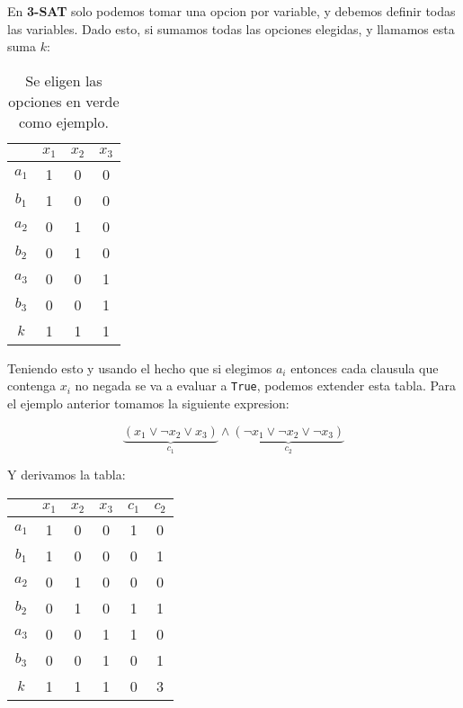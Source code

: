 \newpage 
  
En \textbf{3-SAT} solo podemos tomar una opcion por variable, y debemos definir 
todas las variables. Dado esto, si sumamos todas las opciones elegidas, y 
llamamos esta suma $k$: 

\begin{table}[h!]
  \centering
  \begin{tabular}{ c|c c c }
    & $x_1$ & $x_2$ & $x_3$ \\
    \hline 
    $a_1$ & 1 & 0 & 0 \\
    \rowcolor{green!30}
    $b_1$ & 1 & 0 & 0 \\
    \rowcolor{green!30}
    $a_2$ & 0 & 1 & 0 \\
    $b_2$ & 0 & 1 & 0 \\
    $a_3$ & 0 & 0 & 1 \\
    \rowcolor{green!30}
    $b_3$ & 0 & 0 & 1 \\
    \hline
    $k$ & 1 & 1 & 1 \\
  \end{tabular} 
  \caption*{Se eligen las opciones en verde como ejemplo.}
\end{table}

Teniendo esto y usando el hecho que si elegimos $a_i$ entonces cada clausula 
que contenga $x_i$ no negada se va a evaluar a \texttt{True}, podemos extender esta 
tabla. 
Para el ejemplo anterior tomamos la siguiente expresion: 

\[
  \underbrace{(x_1 \lor \neg x_2 \lor x_3)}_{c_1} 
  \land 
  \underbrace{(\neg x_1 \lor \neg x_2 \lor \neg x_3)}_{c_2} 
\]

Y derivamos la tabla: 

\begin{table}[h!]
  \centering
  \begin{tabular}{ c|c c c | c c }
    & $x_1$ & $x_2$ & $x_3$ & $c_1$ & $c_2$ \\
    \hline 
    $a_1$ & 1 & 0 & 0 & 1 & 0 \\
    \rowcolor{green!30}
    $b_1$ & 1 & 0 & 0 & 0 & 1 \\
    \rowcolor{green!30}
    $a_2$ & 0 & 1 & 0 & 0 & 0 \\
    $b_2$ & 0 & 1 & 0 & 1 & 1 \\
    $a_3$ & 0 & 0 & 1 & 1 & 0 \\
    \rowcolor{green!30}
    $b_3$ & 0 & 0 & 1 & 0 & 1 \\
    \hline
    $k$ & 1 & 1 & 1 & 0 & 3 \\
  \end{tabular} 
\end{table}

